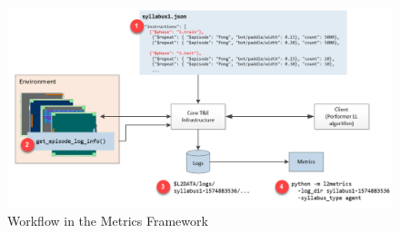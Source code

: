 \begin{figure}[h]
	\centering
	\includegraphics[width=0.9\columnwidth]{sections/figs/metrics_overview_1.png}
	\caption{Workflow in the Metrics Framework}
	\label{fig:workflow}
\end{figure}

